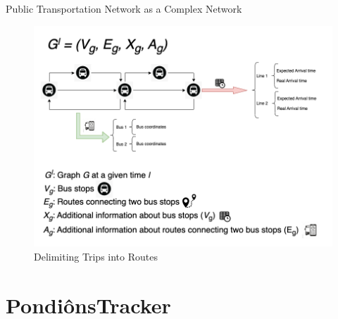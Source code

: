 \documentclass[xcolor=dvipsnames,table]{beamer}
\begin{document}
\begin{frame}{Public Transportation Network as a Complex Network}
        \begin{figure}[H]
                \centering
                \includegraphics[scale=0.3]{images/final_graph.png}
                \caption{Delimiting Trips into Routes}
        \end{figure}
\end{frame}


\section{PondiônsTracker}
\end{document}
